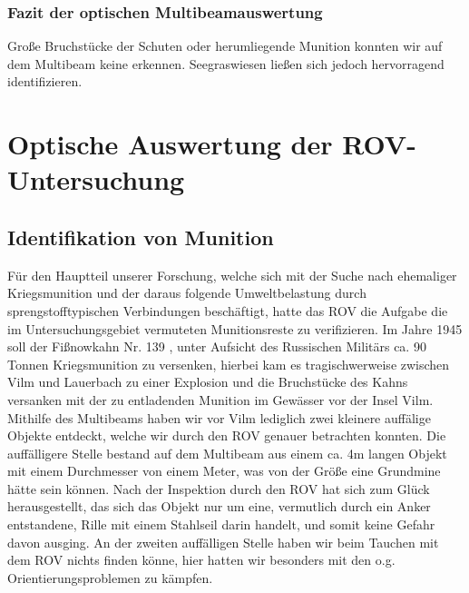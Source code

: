\subsubsection{Fazit der optischen Multibeamauswertung}
Große Bruchstücke der Schuten oder herumliegende Munition konnten wir auf dem Multibeam keine erkennen. Seegraswiesen ließen sich jedoch hervorragend identifizieren. \\

\section{Optische Auswertung der ROV-Untersuchung}
\subsection{Identifikation von Munition}
Für den Hauptteil unserer Forschung, welche sich mit der Suche nach ehemaliger Kriegsmunition und der daraus folgende Umweltbelastung durch sprengstofftypischen Verbindungen beschäftigt,
hatte das ROV die Aufgabe die im Untersuchungsgebiet vermuteten Munitionsreste zu verifizieren. 
Im Jahre 1945 soll der Fißnowkahn Nr. 139 , unter Aufsicht des Russischen Militärs ca. 90 Tonnen Kriegsmunition zu versenken, hierbei kam es tragischwerweise zwischen Vilm und Lauerbach zu einer Explosion und die Bruchstücke des Kahns versanken mit der zu entladenden Munition im Gewässer vor der Insel Vilm.
Mithilfe des Multibeams haben wir vor Vilm lediglich zwei kleinere auffälige Objekte entdeckt, welche wir durch den ROV genauer betrachten konnten. Die auffälligere Stelle bestand auf dem Multibeam aus einem ca. 4m langen Objekt mit einem Durchmesser von einem Meter, was von der Größe eine Grundmine hätte sein können.
Nach der Inspektion durch den ROV hat sich zum Glück herausgestellt, das sich das Objekt nur um eine, vermutlich durch ein Anker entstandene, Rille mit einem Stahlseil darin handelt, und somit keine Gefahr davon ausging.
An der zweiten auffälligen Stelle haben wir beim Tauchen mit dem ROV nichts finden könne, hier hatten wir besonders mit den o.g. Orientierungsproblemen zu kämpfen.

